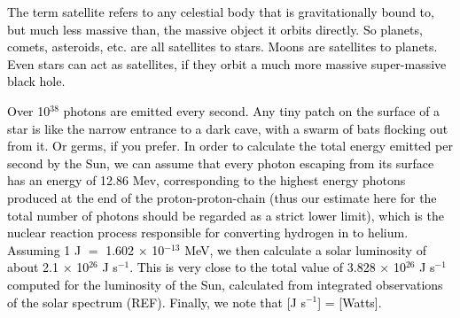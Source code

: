 \documentclass[main.tex]{subfiles}
\begin{document}
\begin{tcolorbox}[sharp corners, colback=red!30, colframe=red!80!blue, title=Box \refstepcounter{educhap1}\label{boxchap1:satellites}\ref{boxchap1:satellites} -- Satellites]
\par \textcolor{black} {The term satellite refers to any celestial body that is gravitationally bound to, but much less massive than, the massive object it orbits directly.  So planets, comets, asteroids, etc. are all satellites to stars.  Moons are satellites to planets.  Even stars can act as satellites, if they orbit a much more massive super-massive black hole.} 
\end{tcolorbox} 



\begin{tcolorbox}[sharp corners, colback=blue!30, colframe=blue!80!blue, title=Box \refstepcounter{educhap1}\label{boxchap1:vt}\ref{boxchap1:vt} -- Virial Theorem]
\par \textcolor{black} {  Over 10$^{38}$ photons are emitted every second.  Any tiny patch on the surface of a star is like the narrow entrance to a dark cave, with a swarm of bats flocking out from it.  Or germs, if you prefer.  In order to calculate the total energy emitted per second by the Sun, we can assume that every photon escaping from its surface has an energy of 12.86 Mev, corresponding to the highest energy photons produced at the end of the proton-proton-chain (thus our estimate here for the total number of photons should be regarded as a strict lower limit), which is the nuclear reaction process responsible for converting hydrogen in to helium.  Assuming 1 J $=$ 1.602 $\times$ 10$^{-13}$ MeV, we then calculate a solar luminosity of about 2.1 ${\times}$ 10$^{26}$ J s$^{-1}$.  This is very close to the total value of 3.828 $\times$ 10$^{26}$ J s$^{-1}$ computed for the luminosity of the Sun, calculated from integrated observations of the solar spectrum (REF). Finally, we note that [J s$^{-1}$] = [Watts].}  
\end{tcolorbox}
\end{document}
